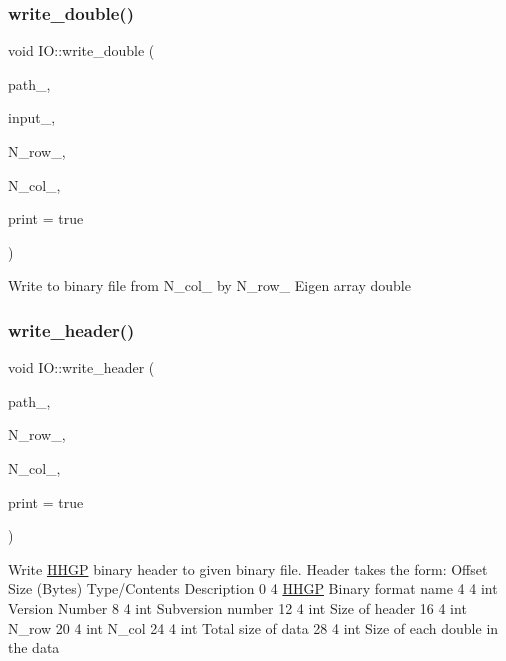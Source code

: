\mbox{\label{class_i_o_a9a648215dc5e33abe2c5a8916fff06d4}} 
\subsubsection{\texorpdfstring{write\+\_\+double()}{write\_double()}}
{\footnotesize\ttfamily void I\+O\+::write\+\_\+double (\begin{DoxyParamCaption}\item[{const std\+::string}]{path\+\_\+,  }\item[{Array\+X\+Xd}]{input\+\_\+,  }\item[{int}]{N\+\_\+row\+\_\+,  }\item[{int}]{N\+\_\+col\+\_\+,  }\item[{bool}]{print = {\ttfamily true} }\end{DoxyParamCaption})}

Write to binary file from N\+\_\+col\+\_\+ by N\+\_\+row\+\_\+ Eigen array double\mbox{\label{class_i_o_a0db950886bb1e6d5571330f771974c4e}} 
\subsubsection{\texorpdfstring{write\+\_\+header()}{write\_header()}}
{\footnotesize\ttfamily void I\+O\+::write\+\_\+header (\begin{DoxyParamCaption}\item[{const std\+::string}]{path\+\_\+,  }\item[{int}]{N\+\_\+row\+\_\+,  }\item[{int}]{N\+\_\+col\+\_\+,  }\item[{bool}]{print = {\ttfamily true} }\end{DoxyParamCaption})}

Write \hyperlink{class_h_h_g_p}{H\+H\+GP} binary header to given binary file. Header takes the form\+: Offset Size (Bytes) Type/\+Contents Description 0 4 \textquotesingle{}\hyperlink{class_h_h_g_p}{H\+H\+GP}\textquotesingle{} Binary format name 4 4 int Version Number 8 4 int Subversion number 12 4 int Size of header 16 4 int N\+\_\+row 20 4 int N\+\_\+col 24 4 int Total size of data 28 4 int Size of each double in the data

